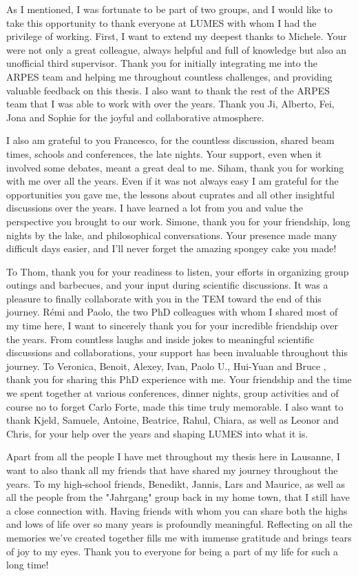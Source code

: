 As I mentioned, I was fortunate to be part of two groups, and I would like to take this opportunity to thank everyone at LUMES with whom I had the privilege of working.
First, I want to extend my deepest thanks to Michele.
Your were not only a great colleague, always helpful and full of knowledge but also an unofficial third supervisor.
Thank you for initially integrating me into the ARPES team and helping me throughout countless challenges, and providing valuable feedback on this thesis.
I also want to thank the rest of the ARPES team that I was able to work with over the years. Thank you Ji, Alberto, Fei, Jona and Sophie for the joyful and collaborative atmosphere.

I also am grateful to you Francesco, for the countless discussion, shared beam times, schools and conferences, the late nights. Your support, even when it involved some debates, meant a great deal to me.
Siham, thank you for working with me over all the years. Even if it was not always easy I am grateful for the opportunities you gave me, the lessons about cuprates and all other insightful discussions over the years. I have learned a lot from you and value the perspective you brought to our work.
Simone, thank you for your friendship, long nights by the lake, and philosophical conversations.
Your presence made many difficult days easier, and I’ll never forget the amazing spongey cake you made!

To Thom, thank you for your readiness to listen, your efforts in organizing group outings and barbecues, and your input during scientific discussions. It was a pleasure to finally collaborate with you in the TEM toward the end of this journey.
Rémi and Paolo, the two PhD colleagues with whom I shared most of my time here, I want to sincerely thank you for your incredible friendship over the years. From countless laughs and inside jokes to meaningful scientific discussions and collaborations, your support has been invaluable throughout this journey.
To Veronica, Benoit, Alexey, Ivan, Paolo U., Hui-Yuan and Bruce , thank you for sharing this PhD experience with me.
Your friendship and the time we spent together at various conferences, dinner nights, group activities and of course no to forget Carlo Forte, made this time truly memorable.
I also want to thank Kjeld, Samuele, Antoine, Beatrice, Rahul, Chiara, as well as Leonor and Chris, for your help over the years and shaping LUMES into what it is.\hfill\break

Apart from all the people I have met throughout my thesis here in Lausanne, I want to also thank all my friends that have shared my journey throughout the years.
To my high-school friends, Benedikt, Jannis, Lars and Maurice, as well as all the people from the "Jahrgang" group back in my home town, that I still have a close connection with.
Having friends with whom you can share both the highs and lows of life over so many years is profoundly meaningful.
Reflecting on all the memories we’ve created together fills me with immense gratitude and brings tears of joy to my eyes.
Thank you to everyone for being a part of my life for such a long time!\hfill\break

